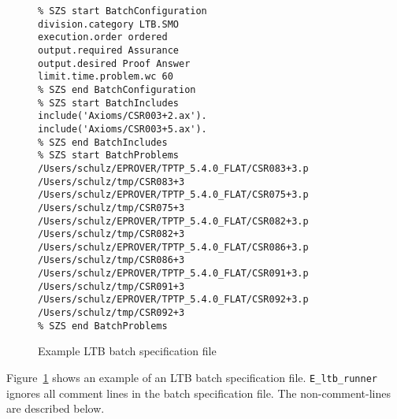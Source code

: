 \documentclass{report}
\begin{document}
\begin{figure}
  \footnotesize
  \centering
  \begin{verbatim}
% SZS start BatchConfiguration
division.category LTB.SMO
execution.order ordered
output.required Assurance
output.desired Proof Answer
limit.time.problem.wc 60
% SZS end BatchConfiguration
% SZS start BatchIncludes
include('Axioms/CSR003+2.ax').
include('Axioms/CSR003+5.ax').
% SZS end BatchIncludes
% SZS start BatchProblems
/Users/schulz/EPROVER/TPTP_5.4.0_FLAT/CSR083+3.p /Users/schulz/tmp/CSR083+3
/Users/schulz/EPROVER/TPTP_5.4.0_FLAT/CSR075+3.p /Users/schulz/tmp/CSR075+3
/Users/schulz/EPROVER/TPTP_5.4.0_FLAT/CSR082+3.p /Users/schulz/tmp/CSR082+3
/Users/schulz/EPROVER/TPTP_5.4.0_FLAT/CSR086+3.p /Users/schulz/tmp/CSR086+3
/Users/schulz/EPROVER/TPTP_5.4.0_FLAT/CSR091+3.p /Users/schulz/tmp/CSR091+3
/Users/schulz/EPROVER/TPTP_5.4.0_FLAT/CSR092+3.p /Users/schulz/tmp/CSR092+3
% SZS end BatchProblems
\end{verbatim}
  \caption{Example LTB batch specification file}
  \label{fig:ltbspec}
\end{figure}

Figure~\ref{fig:ltbspec} shows an example of an LTB batch
specification file. \texttt{E\_ltb\_runner} ignores all comment lines
in the batch specification file. The non-comment-lines are described
below.
\end{document}
